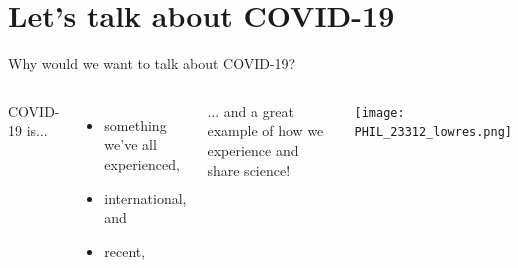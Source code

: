 \section[COVID-19]{Let's talk about COVID-19}
\label{sec:covid}

\begin{frame}{Why would we want to talk about COVID-19?}

\begin{columns}
    
        COVID-19 is...
        
        \begin{itemize}
            \item something we've all experienced,
            \item international, and
            \item recent,
        \end{itemize}
            
        ... and a great example of how we experience and share science!
        
        \texttt{[image: PHIL\_23312\_lowres.png]}\\

\end{columns}

\end{frame}


